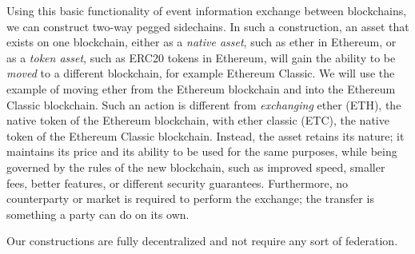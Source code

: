 Using this basic functionality of event information exchange between
blockchains, we can construct two-way pegged sidechains. In such a construction,
an asset that exists on one blockchain, either as a \emph{native asset}, such as
ether in Ethereum, or as a \emph{token asset}, such as ERC20 tokens in Ethereum,
will gain the ability to be \emph{moved} to a different blockchain, for example
Ethereum Classic. We will use the example of moving ether from the Ethereum
blockchain and into the Ethereum Classic blockchain. Such an action is different
from \emph{exchanging} ether (ETH), the native token of the Ethereum blockchain,
with ether classic (ETC), the native token of the Ethereum Classic blockchain.
Instead, the asset retains its nature; it maintains its price and its ability to
be used for the same purposes, while being governed by the rules of the new
blockchain, such as improved speed, smaller fees, better features, or different
security guarantees. Furthermore, no counterparty or market is required to
perform the exchange; the transfer is something a party can do on its own.

Our constructions are fully decentralized and not require any sort of
federation.
